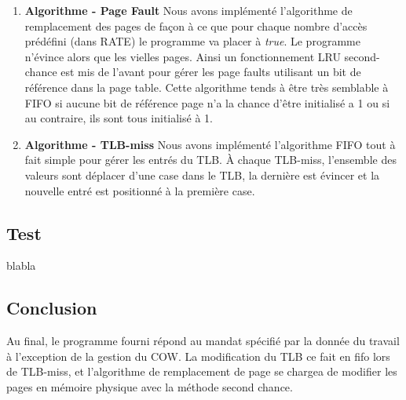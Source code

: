 \documentclass{article}
\begin{document}
\begin{enumerate}
	
	\item \textbf{Algorithme - Page Fault} 
  Nous avons implémenté l'algorithme de remplacement des pages de façon à ce que pour chaque nombre d'accès prédéfini (dans RATE) le programme va placer à 
  {\em true}. Le programme n'évince alors que les vielles pages. Ainsi un fonctionnement LRU second-chance est mis de l'avant pour gérer les page faults utilisant un bit de référence dans la page table. Cette algorithme tends à être très semblable à FIFO si aucune bit de référence page n'a la chance d'être initialisé a 1 ou si au contraire, ils sont tous initialisé à 1.
  
  \item \textbf{Algorithme - TLB-miss} 
  Nous avons implémenté l'algorithme FIFO tout à fait simple pour gérer les entrés du TLB. À chaque TLB-miss,
  l'ensemble des valeurs sont déplacer d'une case dans le TLB, la dernière est évincer et la nouvelle entré est positionné à la première case.
	
	
\end{enumerate}


\subsection*{Test}

blabla


\subsection*{Conclusion}
Au final, le programme fourni répond au mandat spécifié par la donnée du travail à l'exception de la gestion du COW. La modification du TLB ce fait en fifo lors de TLB-miss, et l'algorithme de remplacement de page se chargea de modifier les pages en mémoire physique avec la méthode second chance. 
\end{document}
